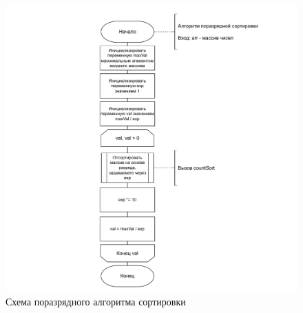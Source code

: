 \begin{figure}[h]
	\centering
	\includegraphics[width=1\linewidth]{img/radix.pdf}
	\caption{Схема поразрядного алгоритма сортировки}
	\label{img:radix}
\end{figure}

